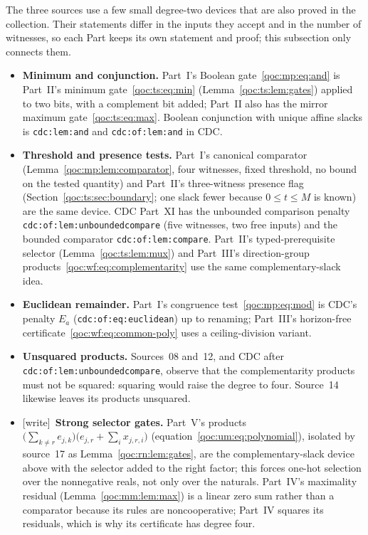\documentclass[11pt,letterpaper]{article}
\theoremstyle{definition}
\theoremstyle{remark}
\newcommand{\wtag}{\textup{[write]}}
\newcommand{\lab}[1]{\nolinkurl{#1}}
\begin{document}
The three sources use a few small degree-two devices that are also proved in the collection. Their statements differ in the inputs they accept and in the number of witnesses, so each Part keeps its own statement and proof; this subsection only connects them.
\begin{itemize}
\item \textbf{Minimum and conjunction.} Part~I's Boolean gate~\eqref{qoc:mp:eq:and} is Part~II's minimum gate~\eqref{qoc:ts:eq:min} (Lemma~\ref{qoc:ts:lem:gates}) applied to two bits, with a complement bit added; Part~II also has the mirror maximum gate~\eqref{qoc:ts:eq:max}. Boolean conjunction with unique affine slacks is \lab{cdc:lem:and} and \lab{cdc:of:lem:and} in CDC.
\item \textbf{Threshold and presence tests.} Part~I's canonical comparator (Lemma~\ref{qoc:mp:lem:comparator}, four witnesses, fixed threshold, no bound on the tested quantity) and Part~II's three-witness presence flag (Section~\ref{qoc:ts:sec:boundary}; one slack fewer because $0\le t\le M$ is known) are the same device. CDC Part~XI has the unbounded comparison penalty \lab{cdc:of:lem:unboundedcompare} (five witnesses, two free inputs) and the bounded comparator \lab{cdc:of:lem:compare}. Part~II's typed-prerequisite selector (Lemma~\ref{qoc:ts:lem:mux}) and Part~III's direction-group products~\eqref{qoc:wf:eq:complementarity} use the same complementary-slack idea.
\item \textbf{Euclidean remainder.} Part~I's congruence test~\eqref{qoc:mp:eq:mod} is CDC's penalty $E_a$ (\lab{cdc:of:eq:euclidean}) up to renaming; Part~III's horizon-free certificate~\eqref{qoc:wf:eq:common-poly} uses a ceiling-division variant.
\item \textbf{Unsquared products.} Sources~08 and~12, and CDC after \lab{cdc:of:lem:unboundedcompare}, observe that the complementarity products must not be squared: squaring would raise the degree to four. Source~14 likewise leaves its products unsquared.
\item \wtag\ \textbf{Strong selector gates.} Part~V's products $\bigl(\sum_{k\ne r}e_{j,k}\bigr)\bigl(e_{j,r}+\sum_i x_{j,r,i}\bigr)$ (equation~\eqref{qoc:um:eq:polynomial}), isolated by source~17 as Lemma~\ref{qoc:rn:lem:gates}, are the complementary-slack device above with the selector added to the right factor; this forces one-hot selection over the nonnegative reals, not only over the naturals. Part~IV's maximality residual (Lemma~\ref{qoc:mm:lem:max}) is a linear zero sum rather than a comparator because its rules are noncooperative; Part~IV squares its residuals, which is why its certificate has degree four.
\end{itemize}
\end{document}
